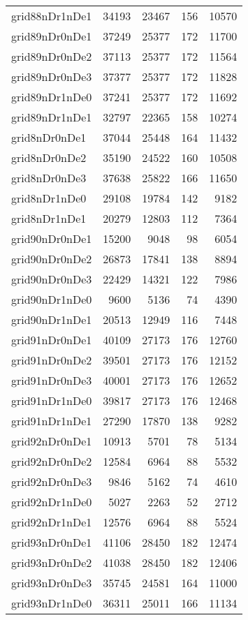 \begin{longtable}{lrrrr}
grid88nDr1nDe1 & 34193 & 23467 & 156 & 10570 \\
grid89nDr0nDe1 & 37249 & 25377 & 172 & 11700 \\
grid89nDr0nDe2 & 37113 & 25377 & 172 & 11564 \\
grid89nDr0nDe3 & 37377 & 25377 & 172 & 11828 \\
grid89nDr1nDe0 & 37241 & 25377 & 172 & 11692 \\
grid89nDr1nDe1 & 32797 & 22365 & 158 & 10274 \\
grid8nDr0nDe1 & 37044 & 25448 & 164 & 11432 \\
grid8nDr0nDe2 & 35190 & 24522 & 160 & 10508 \\
grid8nDr0nDe3 & 37638 & 25822 & 166 & 11650 \\
grid8nDr1nDe0 & 29108 & 19784 & 142 & 9182 \\
grid8nDr1nDe1 & 20279 & 12803 & 112 & 7364 \\
grid90nDr0nDe1 & 15200 & 9048 & 98 & 6054 \\
grid90nDr0nDe2 & 26873 & 17841 & 138 & 8894 \\
grid90nDr0nDe3 & 22429 & 14321 & 122 & 7986 \\
grid90nDr1nDe0 & 9600 & 5136 & 74 & 4390 \\
grid90nDr1nDe1 & 20513 & 12949 & 116 & 7448 \\
grid91nDr0nDe1 & 40109 & 27173 & 176 & 12760 \\
grid91nDr0nDe2 & 39501 & 27173 & 176 & 12152 \\
grid91nDr0nDe3 & 40001 & 27173 & 176 & 12652 \\
grid91nDr1nDe0 & 39817 & 27173 & 176 & 12468 \\
grid91nDr1nDe1 & 27290 & 17870 & 138 & 9282 \\
grid92nDr0nDe1 & 10913 & 5701 & 78 & 5134 \\
grid92nDr0nDe2 & 12584 & 6964 & 88 & 5532 \\
grid92nDr0nDe3 & 9846 & 5162 & 74 & 4610 \\
grid92nDr1nDe0 & 5027 & 2263 & 52 & 2712 \\
grid92nDr1nDe1 & 12576 & 6964 & 88 & 5524 \\
grid93nDr0nDe1 & 41106 & 28450 & 182 & 12474 \\
grid93nDr0nDe2 & 41038 & 28450 & 182 & 12406 \\
grid93nDr0nDe3 & 35745 & 24581 & 164 & 11000 \\
grid93nDr1nDe0 & 36311 & 25011 & 166 & 11134 \\

\end{longtable}
